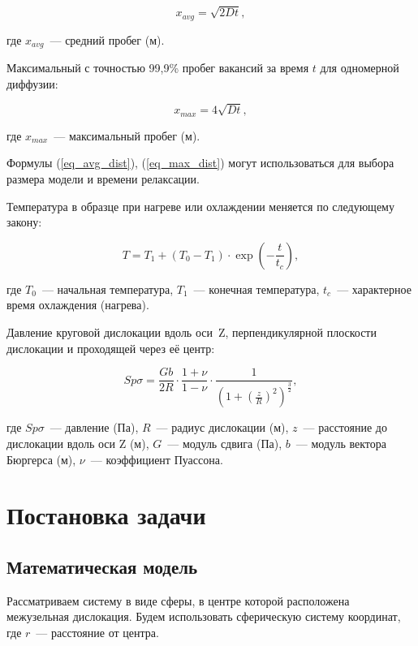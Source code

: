 \documentclass[12pt, a4paper]{article}
\begin{document}
\begin{equation}
\label{eq_avg_dist}
x_{avg} = \sqrt{2Dt},
\end{equation}

\noindent где $x_{avg}$~--- средний пробег (м).

Максимальный с точностью 99,9\% пробег вакансий за время $t$ для одномерной диффузии:

\begin{equation}
\label{eq_max_dist}
x_{max} = 4\sqrt{Dt},
\end{equation}

\noindent где $x_{max}$~--- максимальный пробег (м).

Формулы (\ref{eq_avg_dist}), (\ref{eq_max_dist}) могут использоваться для выбора размера модели и времени релаксации.

Температура в образце при нагреве или охлаждении меняется по следующему закону:

\begin{equation}
T = T_1 + (T_0 - T_1) \cdot \exp(-\frac{t}{t_c}),
\end{equation}

\noindent где $T_0$~--- начальная температура, $T_1$~--- конечная температура, $t_c$~--- характерное время охлаждения (нагрева).

Давление круговой дислокации вдоль оси~Z, перпендикулярной плоскости дислокации и проходящей через её центр:

\begin{equation}
Sp \sigma = \frac{Gb}{2R} \cdot \frac{1 + \nu}{1 - \nu} \cdot \frac{1}{{\left( 1 + \left( \frac{z}{R} \right)^2 \right)}^{\frac{3}{2}}},
\end{equation}

\noindent где $Sp \sigma$~--- давление (Па), $R$~--- радиус дислокации (м), $z$~--- расстояние до дислокации вдоль оси Z (м), $G$~--- модуль сдвига (Па), $b$~--- модуль вектора Бюргерса (м), $\nu$~--- коэффициент Пуассона.

\section{Постановка задачи}

\subsection{Математическая модель}

Рассматриваем систему в виде сферы, в центре которой расположена межузельная дислокация. Будем использовать сферическую систему координат, где $r$~--- расстояние от центра.
\end{document}
